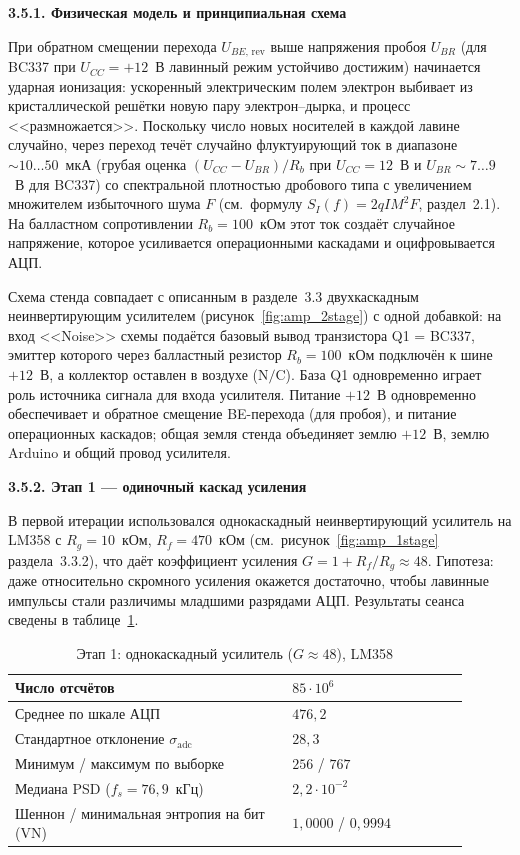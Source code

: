 \textbf{3.5.1. Физическая модель и принципиальная схема}

При обратном смещении перехода $U_{BE,\,\text{rev}}$ выше напряжения пробоя
$U_{BR}$ (для BC337 при $U_{CC}=+12$~В лавинный режим устойчиво достижим) начинается ударная
ионизация: ускоренный электрическим полем электрон выбивает из кристаллической
решётки новую пару электрон--дырка, и процесс <<размножается>>. Поскольку число
новых носителей в каждой лавине случайно, через переход течёт случайно
флуктуирующий ток в диапазоне ${\sim}10\ldots 50$~мкА (грубая оценка
$(U_{CC}-U_{BR})/R_b$ при $U_{CC}=12$~В и $U_{BR}\!\sim\!7\ldots 9$~В для
BC337) со спектральной плотностью дробового типа с увеличением множителем
избыточного шума $F$ (см.~формулу $S_I(f)=2qIM^2F$, раздел~2.1). На балластном
сопротивлении $R_b=100$~кОм этот ток создаёт случайное напряжение, которое
усиливается операционными каскадами и оцифровывается АЦП.

Схема стенда совпадает с описанным в разделе~3.3 двухкаскадным неинвертирующим
усилителем (рисунок~\ref{fig:amp_2stage}) с одной добавкой: на вход <<Noise>>
схемы подаётся базовый вывод транзистора Q1 = BC337, эмиттер которого через
балластный резистор $R_b=100$~кОм подключён к шине $+12$~В, а коллектор
оставлен в воздухе ($\text{N/C}$). База Q1 одновременно играет роль источника
сигнала для входа усилителя. Питание $+12$~В одновременно обеспечивает и
обратное смещение BE-перехода (для пробоя), и питание операционных каскадов;
общая земля стенда объединяет землю $+12$~В, землю Arduino и общий провод
усилителя.

\textbf{3.5.2. Этап 1 --- одиночный каскад усиления}

В первой итерации использовался однокаскадный неинвертирующий усилитель на LM358
с $R_g=10$~кОм, $R_f=470$~кОм (см.~рисунок~\ref{fig:amp_1stage} раздела~3.3.2),
что даёт коэффициент усиления $G=1+R_f/R_g\approx 48$. Гипотеза: даже относительно
скромного усиления окажется достаточно, чтобы лавинные импульсы стали различимы
младшими разрядами АЦП. Результаты сеанса сведены в
таблице~\ref{tab:bjt_stage1_summary}.

\begin{table}[htbp]
  \centering
  \footnotesize
  \caption{Этап 1: однокаскадный усилитель ($G\approx 48$), LM358}
  \label{tab:bjt_stage1_summary}
  \begin{tabular}{|p{0.55\linewidth}|p{0.35\linewidth}|}
    \hline
    Число отсчётов & $85\cdot 10^6$ \\
    \hline
    Среднее по шкале АЦП & $476{,}2$ \\
    \hline
    Стандартное отклонение $\sigma_\mathrm{adc}$ & $28{,}3$ \\
    \hline
    Минимум / максимум по выборке & $256$ / $767$ \\
    \hline
    Медиана PSD ($f_s=76{,}9$~кГц) & $2{,}2\cdot 10^{-2}$ \\
    \hline
    Шеннон / минимальная энтропия на бит (VN) & $1{,}0000$ / $0{,}9994$ \\
    \hline
  \end{tabular}
\end{table}

